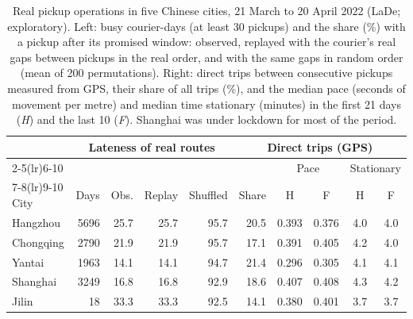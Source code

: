 \begin{table}[h!]
\centering
\small
\setlength{\tabcolsep}{3.5pt}
\caption{Real pickup operations in five Chinese cities, 21 March to 20 April 2022 (LaDe; exploratory). Left: busy courier-days (at least 30 pickups) and the share (\%) with a pickup after its promised window: observed, replayed with the courier's real gaps between pickups in the real order, and with the same gaps in random order (mean of 200 permutations). Right: direct trips between consecutive pickups measured from GPS, their share of all trips (\%), and the median pace (seconds of movement per metre) and median time stationary (minutes) in the first 21 days (\emph{H}) and the last 10 (\emph{F}). Shanghai was under lockdown for most of the period.}
\label{tab:lade}
\begin{tabular}{@{}lrrrrrcccc@{}}
\toprule
 & \multicolumn{4}{c}{Lateness of real routes} & \multicolumn{5}{c}{Direct trips (GPS)}\\
\cmidrule(lr){2-5}\cmidrule(lr){6-10}
 & & & & & & \multicolumn{2}{c}{Pace} & \multicolumn{2}{c}{Stationary}\\
\cmidrule(lr){7-8}\cmidrule(lr){9-10}
City & Days & Obs. & Replay & Shuffled & Share & H & F & H & F\\
\midrule
Hangzhou & 5696 & 25.7 & 25.7 & 95.7 & 20.5 & 0.393 & 0.376 & 4.0 & 4.0\\
Chongqing & 2790 & 21.9 & 21.9 & 95.7 & 17.1 & 0.391 & 0.405 & 4.2 & 4.0\\
Yantai & 1963 & 14.1 & 14.1 & 94.7 & 21.4 & 0.296 & 0.305 & 4.1 & 4.1\\
Shanghai & 3249 & 16.8 & 16.8 & 92.9 & 18.6 & 0.407 & 0.408 & 4.3 & 4.2\\
Jilin & 18 & 33.3 & 33.3 & 92.5 & 14.1 & 0.380 & 0.401 & 3.7 & 3.7\\
\bottomrule
\end{tabular}
\end{table}

